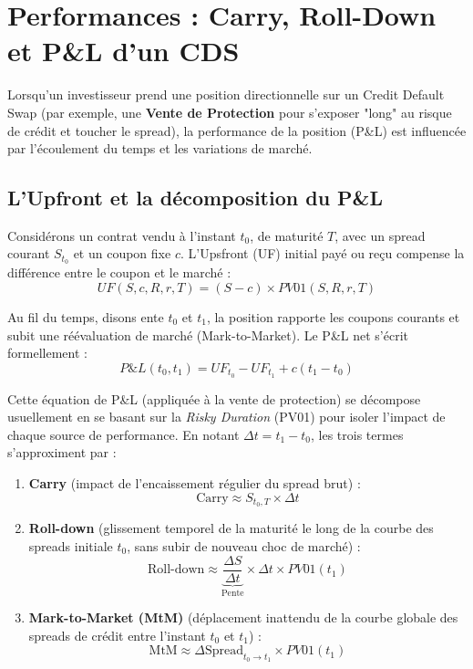 \section{Performances : Carry, Roll-Down et P\&L d'un CDS}

Lorsqu'un investisseur prend une position directionnelle sur un Credit Default Swap (par exemple, une \textbf{Vente de Protection} pour s'exposer "long" au risque de crédit et toucher le spread), la performance de la position (P\&L) est influencée par l'écoulement du temps et les variations de marché.

\subsection{L'Upfront et la décomposition du P\&L}

Considérons un contrat vendu à l'instant $t_0$, de maturité $T$, avec un spread courant $S_{t_0}$ et un coupon fixe $c$. L'Upsfront (UF) initial payé ou reçu compense la différence entre le coupon et le marché :
\begin{equation}
    UF(S, c, R, r, T) = (S - c) \times PV01(S, R, r, T)
\end{equation}

Au fil du temps, disons ente $t_0$ et $t_1$, la position rapporte les coupons courants et subit une réévaluation de marché (Mark-to-Market). Le P\&L net s'écrit formellement :
\begin{equation}
    P\&L(t_0, t_1) = UF_{t_0} - UF_{t_1} + c(t_1 - t_0)
\end{equation}

Cette équation de P\&L (appliquée à la vente de protection) se décompose usuellement en se basant sur la \textit{Risky Duration} (PV01) pour isoler l'impact de chaque source de performance. En notant $\Delta t = t_1 - t_0$, les trois termes s'approximent par :
\begin{enumerate}
    \item \textbf{Carry} (impact de l'encaissement régulier du spread brut) :
    \begin{equation}
        \text{Carry} \approx S_{t_0, T} \times \Delta t
    \end{equation}
    
    \item \textbf{Roll-down} (glissement temporel de la maturité le long de la courbe des spreads initiale $t_0$, sans subir de nouveau choc de marché) :
    \begin{equation}
        \text{Roll-down} \approx \underbrace{\frac{\Delta S}{\Delta t}}_{\text{Pente}} \times \Delta t \times PV01(t_1)
    \end{equation}
    
    \item \textbf{Mark-to-Market (MtM)} (déplacement inattendu de la courbe globale des spreads de crédit entre l'instant $t_0$ et $t_1$) :
    \begin{equation}
        \text{MtM} \approx \Delta \text{Spread}_{t_0 \to t_1} \times PV01(t_1)
    \end{equation}
\end{enumerate}

